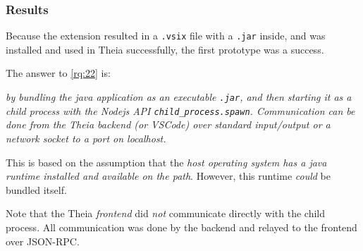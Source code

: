 \subsubsection{Results}
Because the extension resulted in a \texttt{.vsix} file with a \texttt{.jar} inside, and was installed and used in Theia successfully, the first prototype was a success.

The answer to \cref{rq:22} is:
\begin{displayquote}
  \emph{by bundling the java application as an executable \texttt{.jar}, and then starting it as a child process with the \gls{Nodejs} \acrshort{API} \texttt{child\_process.spawn}. Communication can be done from the Theia backend (or VSCode) over standard input/output or a network socket to a port on localhost.}
\end{displayquote}
  
This is based on the assumption that the \emph{host operating system has a java runtime installed and available on the path}.
However, this runtime \textit{could} be bundled itself.

Note that the Theia \emph{frontend} did \emph{not} communicate directly with the child process.
All communication was done by the backend and relayed to the frontend over \gls{JSON-RPC}.
